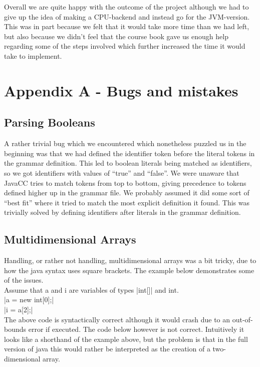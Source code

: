 \documentclass[paper=a4, fontsize=11pt]{scrartcl} %
\numberwithin{equation}{section} %
\numberwithin{figure}{section} %
\numberwithin{table}{section} %
\begin{document}
Overall we are quite happy with the outcome of the project although we had to give up the idea of making a CPU-backend and instead go for the JVM-version.
This was in part because we felt that it would take more time than we had left, but also because we didn’t feel that the course book gave us enough help regarding some of the steps involved which further increased the time it would take to implement.

\section{Appendix A - Bugs and mistakes}

\subsection{Parsing Booleans}

A rather trivial bug which we encountered which nonetheless puzzled us in the beginning was that we had defined the identifier token before the literal tokens in the grammar definition.
This led to boolean literals being matched as identifiers, so we got identifiers with values of “true” and “false”.
We were unaware that JavaCC tries to match tokens from top to bottom, giving precedence to tokens defined higher up in the grammar file.
We probably assumed it did some sort of “best fit” where it tried to match the most explicit definition it found.
This was trivially solved by defining identifiers after literals in the grammar definition.

\subsection{Multidimensional Arrays}

Handling, or rather not handling, multidimensional arrays was a bit tricky, due to how the java syntax uses square brackets. The example below demonstrates some of the issues.\\

Assume that a and i are variables of types |int[]| and int.\\

|a = new int[0];|\\
|i = a[2];|\\

The above code is syntactically correct although it would crash due to an out-of-bounds error if executed.
The code below however is not correct.
Intuitively it looks like a shorthand of the example above, but the problem is that in the full version of java this would rather be interpreted as the creation of a two-dimensional array.\\
\end{document}
